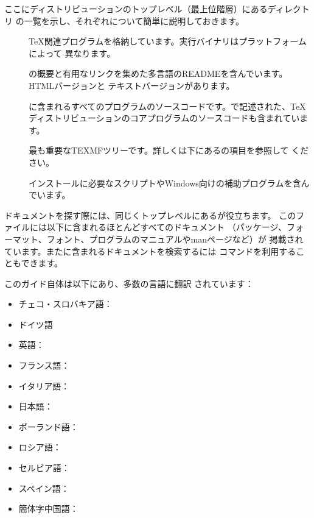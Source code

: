 \documentclass[uplatex,dvipdfmx,12pt,tombow]{jsarticle}
\begin{document}
ここに\TL ディストリビューションのトップレベル（最上位階層）にあるディレクトリ
の一覧を示し、それぞれについて簡単に説明しておきます。
%
\begin{description}
\item[]
\TeX 関連プログラムを格納しています。実行バイナリはプラットフォームによって
異なります。

\item[]
\TL の概要と有用なリンクを集めた多言語のREADMEを含んでいます。HTMLバージョンと
テキストバージョンがあります。

\item[]
\TL に含まれるすべてのプログラムのソースコードです。\Webc で記述された、\TeX
ディストリビューションのコアプログラムのソースコードも含まれています。

\item[]
最も重要なTEXMFツリーです。詳しくは下にあるの項目を参照して
ください。

\item[]
インストールに必要なスクリプトやWindows向けの補助プログラムを含んでいます。
\end{description}
%
ドキュメントを探す際には、同じくトップレベルにあるが役立ちます。
このファイルには以下に含まれるほとんどすべてのドキュメント
（パッケージ、フォーマット、フォント、プログラムのマニュアルやmanページなど）が
掲載されています。また\TL に含まれるドキュメントを検索するには%
コマンドを利用することもできます。

この\TL ガイド自体は以下にあり、多数の言語に翻訳
されています：
%
\begin{itemize}
\item チェコ・スロバキア語：
\item ドイツ語
\item 英語：
\item フランス語：
\item イタリア語：
\item 日本語：
\item ポーランド語：
\item ロシア語：
\item セルビア語：
\item スペイン語：
\item 簡体字中国語：
\end{itemize}
\end{document}
